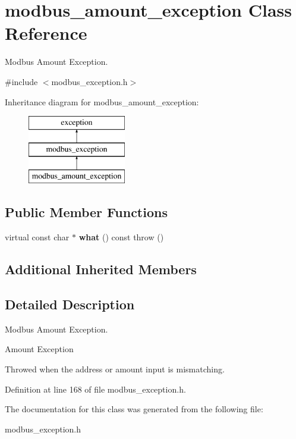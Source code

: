 \hypertarget{classmodbus__amount__exception}{}\section{modbus\+\_\+amount\+\_\+exception Class Reference}
\label{classmodbus__amount__exception}


Modbus Amount Exception.  




{\ttfamily \#include $<$modbus\+\_\+exception.\+h$>$}

Inheritance diagram for modbus\+\_\+amount\+\_\+exception\+:\begin{figure}[H]
\begin{center}
\leavevmode
\includegraphics[height=3.000000cm]{classmodbus__amount__exception}
\end{center}
\end{figure}
\subsection*{Public Member Functions}
\begin{DoxyCompactItemize}
\item 
\mbox{\label{classmodbus__amount__exception_ad96c75d34b145f93f2c2a2bd59c06c7e}} 
virtual const char $\ast$ {\bfseries what} () const  throw ()
\end{DoxyCompactItemize}
\subsection*{Additional Inherited Members}


\subsection{Detailed Description}
Modbus Amount Exception. 

Amount Exception

Throwed when the address or amount input is mismatching. 

Definition at line 168 of file modbus\+\_\+exception.\+h.



The documentation for this class was generated from the following file\+:\begin{DoxyCompactItemize}
\item 
modbus\+\_\+exception.\+h\end{DoxyCompactItemize}
